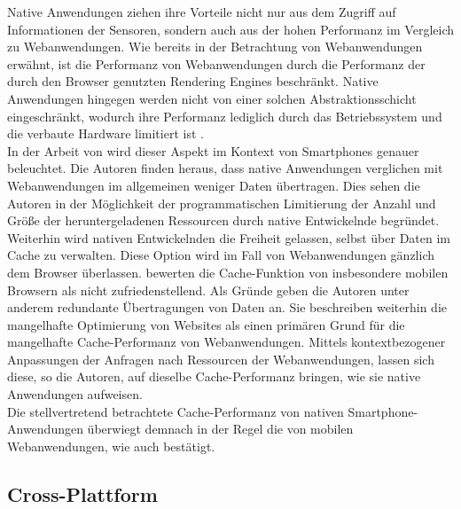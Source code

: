 \documentclass[a4paper]{scrartcl}
\begin{document}
Native Anwendungen ziehen ihre Vorteile nicht nur aus dem Zugriff auf Informationen der Sensoren, sondern auch aus der hohen Performanz im Vergleich zu Webanwendungen. Wie bereits in der Betrachtung von Webanwendungen erwähnt, ist die Performanz von Webanwendungen durch die Performanz der durch den Browser genutzten Rendering Engines beschränkt. Native Anwendungen hingegen werden nicht von einer solchen Abstraktionsschicht eingeschränkt, wodurch ihre Performanz lediglich durch das Betriebssystem und die verbaute Hardware limitiert ist \textcite[28]{Jobe}. \\
In der Arbeit von \textcite[999]{native_vs_web} wird dieser Aspekt im Kontext von Smartphones genauer beleuchtet. Die Autoren finden heraus, dass native Anwendungen verglichen mit Webanwendungen im allgemeinen weniger Daten übertragen. Dies sehen die Autoren in der Möglichkeit der programmatischen Limitierung der Anzahl und Größe der heruntergeladenen Ressourcen durch native Entwickelnde begründet. Weiterhin wird nativen Entwickelnden die Freiheit gelassen, selbst über Daten im Cache zu verwalten. Diese Option wird im Fall von Webanwendungen gänzlich dem Browser überlassen. \textcite[999]{native_vs_web} bewerten die Cache-Funktion von insbesondere mobilen Browsern als nicht zufriedenstellend. Als Gründe geben die Autoren unter anderem redundante Übertragungen von Daten an. Sie beschreiben weiterhin die mangelhafte Optimierung von Websites als einen primären Grund für die mangelhafte Cache-Performanz von Webanwendungen. Mittels kontextbezogener Anpassungen der Anfragen nach Ressourcen der Webanwendungen, lassen sich diese, so die Autoren, auf dieselbe Cache-Performanz bringen, wie sie native Anwendungen aufweisen. \\
Die stellvertretend betrachtete Cache-Performanz von nativen Smartphone-Anwendungen überwiegt demnach in der Regel die von mobilen Webanwendungen, wie auch \textcite[1]{Beyond_native_apps} bestätigt.

\newpage

\subsection{Cross-Plattform}
\end{document}
